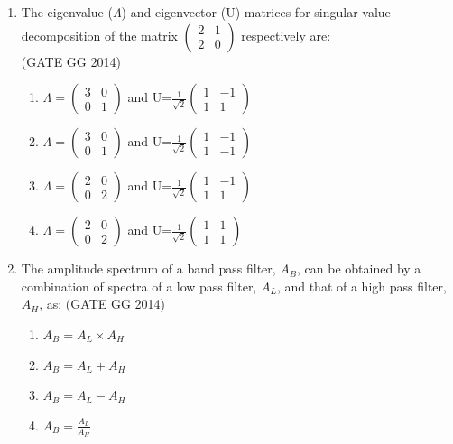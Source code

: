 \documentclass[journal]{IEEEtran}
\begin{document}
\begin{enumerate}[start=26]
\item The eigenvalue ($\Lambda$) and eigenvector (U) matrices for singular value decomposition of the matrix $\begin{pmatrix}
    2 & 1 \\
    2 & 0
\end{pmatrix}$ respectively are:\\
\hspace*{15.7cm}(GATE GG 2014)
\begin{multicols}{2}
\begin{enumerate}
    \item $\Lambda=\begin{pmatrix}
        3 & 0\\
        0 & 1
    \end{pmatrix}$ and U=$\frac{1}{\sqrt{2}}\begin{pmatrix}
        1 & -1\\
        1 & 1
    \end{pmatrix}$
    \item $\Lambda=\begin{pmatrix}
        3 & 0\\
        0 & 1
    \end{pmatrix}$ and U=$\frac{1}{\sqrt{2}}\begin{pmatrix}
        1 & -1\\
        1 & -1
    \end{pmatrix}$
    \item $\Lambda=\begin{pmatrix}
        2 & 0\\
        0 & 2
    \end{pmatrix}$ and U=$\frac{1}{\sqrt{2}}\begin{pmatrix}
        1 & -1\\
        1 & 1
    \end{pmatrix}$
    \item $\Lambda=\begin{pmatrix}
        2 & 0\\
        0 & 2
    \end{pmatrix}$ and U=$\frac{1}{\sqrt{2}}\begin{pmatrix}
        1 & 1\\
        1 & 1
    \end{pmatrix}$
\end{enumerate}
\end{multicols}

\item The amplitude spectrum of a band pass filter, $A_B$, can be obtained by a combination of spectra of a low pass filter, $A_L$, and that of a high pass filter, $A_H$, as:
\hfill(GATE GG 2014)
\begin{multicols}{2}
    \begin{enumerate}
    \item $A_B = A_L \times A_H$
    \item$ A_B = A_L + A_H $
    \item $ A_B = A_L - A_H $
    \item $ A_B = \frac{A_L}{A_H} $
\end{enumerate}
\end{multicols}


\end{enumerate}
\end{document}
